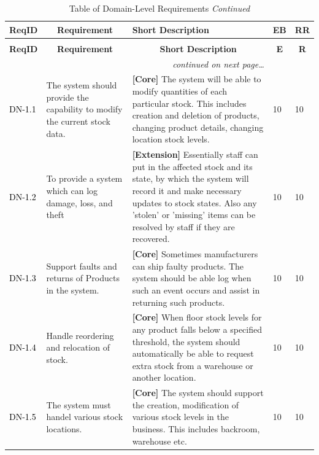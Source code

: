 \documentclass[a4paper]{article}
\begin{document}
\begin{longtable}{|l|p{5cm}|p{7cm}|p{0.5cm}|p{0.5cm}|}
  \caption{Table of Domain-Level Requirements}\\
  \hline
  \multicolumn{1}{|c|}{\textbf{ReqID}}  &
  \multicolumn{1}{|c|}{\textbf{Requirement}} &
  \textbf{Short Description}&
  \textbf{EB} & 
  \textbf{RR}\\
  \hline\hline
  \endfirsthead
  \caption[]{Table of Domain-Level Requirements \textit{Continued}}\\
  \hline
  \multicolumn{1}{|c|}{\textbf{ReqID}} &
  \multicolumn{1}{|c|}{\textbf{Requirement}} &
  \multicolumn{1}{|c|}{\textbf{Short Description}} & 
  \multicolumn{1}{|c|}{\textbf{E}} & 
  \multicolumn{1}{|c|}{\textbf{R}}\\
  \hline\hline
  \endhead
  \hline
  \multicolumn{3}{r}{\textit{continued on next page\ldots}}\\
  \endfoot
  \hline
  \endlastfoot
  \textcolor{black}{DN-1.1} & The system should provide the capability to modify the current stock data. & \textbf{[Core] }The system will be able to modify quantities of each particular stock. This includes creation and deletion of products, changing product details, changing location stock levels.& 10 & 10\\
  \textcolor{black}{DN-1.2} &  To provide a system which can log damage, loss, and theft & \textbf{[Extension] }Essentially staff can put in the affected stock and its state, by which the system will record it and make necessary updates to stock states. Also any ’stolen’ or ’missing’ items can be resolved by staff if they are recovered.  & 10 & 10\\
  \textcolor{black}{DN-1.3} & Support faults and returns of Products in the system.  & \textbf{[Core] }Sometimes manufacturers can ship faulty products. The system should be able log when such an event occurs and assist in returning such products.& 10 & 10\\
  \textcolor{black}{DN-1.4} & Handle reordering and relocation of stock. & \textbf{[Core] }When floor stock levels for any product falls below a specified threshold, the system should automatically be able to request extra stock from a warehouse or another location.& 10 & 10\\
    \textcolor{black}{DN-1.5} & The system must handel various stock locations. & \textbf{[Core] }The system should support the creation, modification of various stock levels in the business. This includes backroom, warehouse etc.& 10 & 10\\

\end{longtable}
\end{document}
